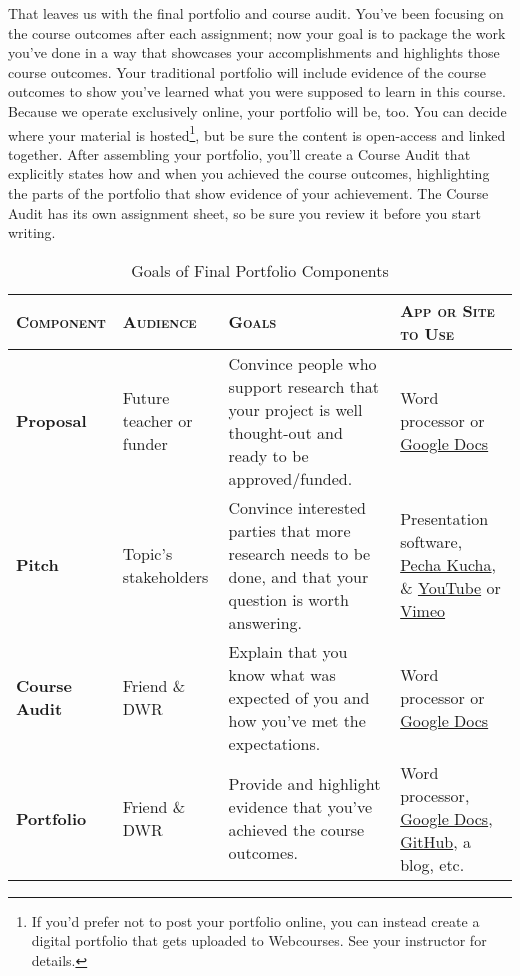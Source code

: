 \documentclass[11pt,oneside]{amsart}	%
\begin{document}
That leaves us with the final portfolio and course audit. You've been focusing on the course outcomes after each assignment; now your goal is to package the work you've done in a way that showcases your accomplishments and highlights those course outcomes. Your traditional portfolio will include evidence of the course outcomes to show you've learned what you were supposed to learn in this course. Because we operate exclusively online, your portfolio will be, too. You can decide where your material is hosted\footnote{If you'd prefer not to post your portfolio online, you can instead create a digital portfolio that gets uploaded to Webcourses. See your instructor for details.}, but be sure the content is open-access and linked together. After assembling your portfolio, you'll create a Course Audit that explicitly states how and when you achieved the course outcomes, highlighting the parts of the portfolio that show evidence of your achievement. The Course Audit has its own assignment sheet, so be sure you review it before you start writing.

\begin{table}[b]%
	\caption{Goals of Final Portfolio Components}\label{tab:goals}
\begin{tabulary}{\textwidth}{lLLL}
	\toprule  \textbf{\textsc{Component}} & \mbox{\textbf{\textsc{Audience}}} & \textbf{\textsc{Goals}} & \textbf{\textsc{App or Site to Use}}\\
\midrule	\textbf{Proposal} & Future teacher or funder & Convince people who support research that your project is well thought-out and ready to be approved/funded. & Word processor or \href{http://docs.google.com}{Google Docs} \\
\midrule	\textbf{Pitch} & Topic's stakeholders & Convince interested parties that more research needs to be done, and that your question is worth answering. & Presentation software, \href{http://www.pechakucha.org/}{Pecha Kucha}, \& \href{http://www.youtube.com/}{YouTube} or \href{https://vimeo.com/home/myvideos}{Vimeo} \\
\midrule	\textbf{Course Audit} & Friend \& DWR & Explain that you know what was expected of you and how you've met the expectations. & Word processor or \href{http://docs.google.com}{Google Docs} \\
\midrule	\textbf{Portfolio} & Friend \& DWR  & Provide and highlight evidence that you've achieved the course outcomes. & Word processor, \href{http://docs.google.com}{Google Docs}, \href{https://github.com/}{GitHub}, a blog, etc. \\
	\bottomrule
\end{tabulary}
\end{table}
\end{document}
